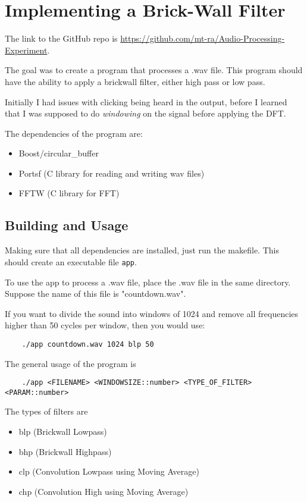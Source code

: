 \section{Implementing a Brick-Wall Filter}

The link to the GitHub repo is \href{https://github.com/mt-ra/Audio-Processing-Experiment}{https://github.com/mt-ra/Audio-Processing-Experiment}.

The goal was to create a program that processes a .wav file. 
This program should have the ability to apply a brickwall filter, 
either high pass or low pass.

Initially I had issues with clicking being heard in the output, 
before I learned that I was supposed to do \emph{windowing} on the signal before
applying the DFT.

The dependencies of the program are:
\begin{itemize}
    \item Boost/circular\_buffer
    \item Portsf (C library for reading and writing wav files)
    \item FFTW (C library for FFT)
\end{itemize}

\subsection{Building and Usage}
Making sure that all dependencies are installed, just run the makefile.
This should create an executable file \verb|app|.

To use the app to process a .wav file, place the .wav file in the same directory.
Suppose the name of this file is "countdown.wav".

If you want to divide the sound into windows of 1024 and remove
all frequencies higher than 50 cycles per window, then you would use:

\begin{verbatim}
    ./app countdown.wav 1024 blp 50
\end{verbatim}

The general usage of the program is

\begin{verbatim}
    ./app <FILENAME> <WINDOWSIZE::number> <TYPE_OF_FILTER> <PARAM::number>
\end{verbatim}

The types of filters are 
\begin{itemize}
    \item blp (Brickwall Lowpass)
    \item bhp (Brickwall Highpass)
    \item clp (Convolution Lowpass using Moving Average)
    \item chp (Convolution High using Moving Average)
\end{itemize}

